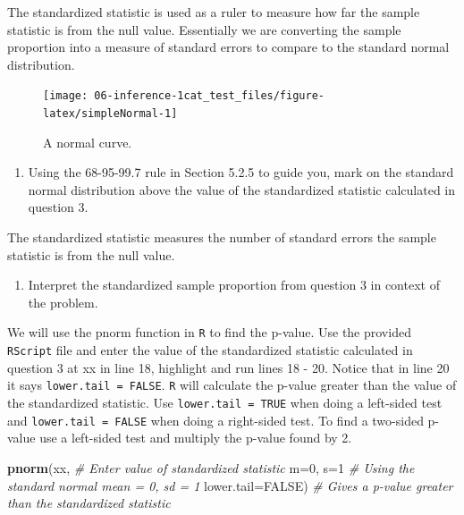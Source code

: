 \documentclass[
]{report}
\newenvironment{Shaded}{\begin{snugshade}}{\end{snugshade}}
\newcommand{\CommentTok}[1]{\textcolor[rgb]{0.56,0.35,0.01}{\textit{#1}}}
\newcommand{\DataTypeTok}[1]{\textcolor[rgb]{0.13,0.29,0.53}{#1}}
\newcommand{\DecValTok}[1]{\textcolor[rgb]{0.00,0.00,0.81}{#1}}
\newcommand{\KeywordTok}[1]{\textcolor[rgb]{0.13,0.29,0.53}{\textbf{#1}}}
\newcommand{\NormalTok}[1]{#1}
\newcommand{\OtherTok}[1]{\textcolor[rgb]{0.56,0.35,0.01}{#1}}
\providecommand{\tightlist}{%
  \setlength{\itemsep}{0pt}\setlength{\parskip}{0pt}}
\begin{document}
\vspace{1in}

The standardized statistic is used as a ruler to measure how far the sample statistic is from the null value. Essentially we are converting the sample proportion into a measure of standard errors to compare to the standard normal distribution.

\begin{figure}

{\centering \texttt{[image: 06-inference-1cat\_test\_files/figure-latex/simpleNormal-1]} 

}

\caption{A normal curve.}\label{fig:simpleNormal}
\end{figure}

\begin{enumerate}
\def\labelenumi{\arabic{enumi}.}
\setcounter{enumi}{3}
\tightlist
\item
  Using the 68-95-99.7 rule in Section 5.2.5 to guide you, mark on the standard normal distribution above the value of the standardized statistic calculated in question 3.
\end{enumerate}

\vspace{0.2in}

The standardized statistic measures the number of standard errors the sample statistic is from the null value.

\begin{enumerate}
\def\labelenumi{\arabic{enumi}.}
\setcounter{enumi}{4}
\tightlist
\item
  Interpret the standardized sample proportion from question 3 in context of the problem.
\end{enumerate}

\vspace{1in}

We will use the pnorm function in \texttt{R} to find the p-value. Use the provided \texttt{RScript} file and enter the value of the standardized statistic calculated in question 3 at xx in line 18, highlight and run lines 18 - 20. Notice that in line 20 it says \texttt{lower.tail\ =\ FALSE}. \texttt{R} will calculate the p-value greater than the value of the standardized statistic. Use \texttt{lower.tail\ =\ TRUE} when doing a left-sided test and \texttt{lower.tail\ =\ FALSE} when doing a right-sided test. To find a two-sided p-value use a left-sided test and multiply the p-value found by 2.

\begin{Shaded}
\begin{Highlighting}[]
\KeywordTok{pnorm}\NormalTok{(xx, }\CommentTok{\# Enter value of standardized statistic}
      \DataTypeTok{m=}\DecValTok{0}\NormalTok{, }\DataTypeTok{s=}\DecValTok{1} \CommentTok{\# Using the standard normal mean = 0, sd = 1}
      \DataTypeTok{lower.tail=}\OtherTok{FALSE}\NormalTok{) }\CommentTok{\# Gives a p{-}value greater than the standardized statistic}
\end{Highlighting}
\end{Shaded}
\end{document}
